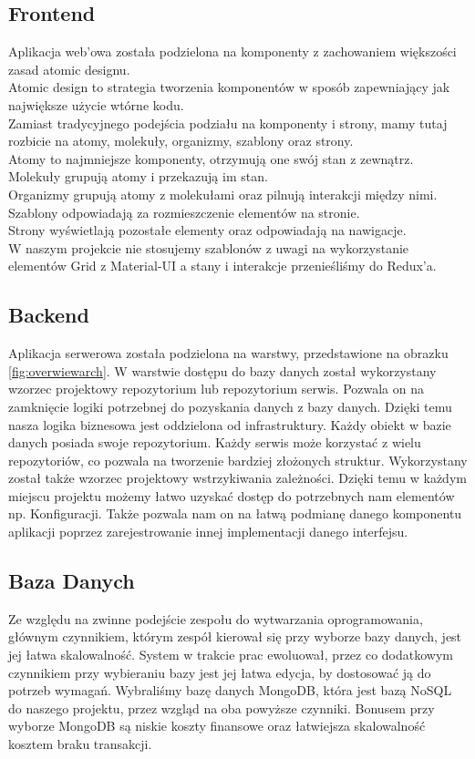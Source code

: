 \documentclass[a4paper,11pt]{report}
\begin{document}
\subsection{Frontend}
Aplikacja web'owa została podzielona na komponenty z zachowaniem większości zasad atomic designu.\\
Atomic design\cite{atomicdesign} to strategia tworzenia komponentów w sposób zapewniający jak największe użycie wtórne kodu.\\
Zamiast tradycyjnego podejścia podziału na komponenty i strony, mamy tutaj rozbicie na atomy, molekuły, organizmy, szablony oraz strony.\\
Atomy to najmniejsze komponenty, otrzymują one swój stan z zewnątrz.\\
Molekuły grupują atomy i przekazują im stan.\\
Organizmy grupują atomy z molekułami oraz pilnują interakcji między nimi.\\
Szablony odpowiadają za rozmieszczenie elementów na stronie.\\
Strony wyświetlają pozostałe elementy oraz odpowiadają na nawigacje.\\
W naszym projekcie nie stosujemy szablonów z uwagi na wykorzystanie elementów Grid z Material-UI a stany i interakcje przenieśliśmy do Redux'a.\\
\subsection{Backend}
Aplikacja serwerowa została podzielona na warstwy, przedstawione na obrazku \ref{fig:overwiewarch}.
W warstwie dostępu do bazy danych został wykorzystany wzorzec projektowy repozytorium lub repozytorium serwis.
Pozwala on na zamknięcie logiki potrzebnej do pozyskania danych z bazy danych.
Dzięki temu nasza logika biznesowa jest oddzielona od infrastruktury.
Każdy obiekt w bazie danych posiada swoje repozytorium.
Każdy serwis może korzystać z wielu repozytoriów, co pozwala na tworzenie bardziej złożonych struktur.
Wykorzystany został także wzorzec projektowy wstrzykiwania zależności.
Dzięki temu w każdym miejscu projektu możemy łatwo uzyskać dostęp do potrzebnych nam elementów np. Konfiguracji.
Także pozwala nam on na łatwą podmianę danego komponentu aplikacji poprzez zarejestrowanie innej implementacji danego interfejsu.\\
\subsection{Baza Danych}
Ze względu na zwinne podejście zespołu do wytwarzania oprogramowania, głównym czynnikiem, którym zespół kierował się przy wyborze bazy danych, jest jej łatwa skalowalność.
System w trakcie prac ewoluował, przez co dodatkowym czynnikiem przy wybieraniu bazy jest jej łatwa edycja, by dostosować ją do potrzeb wymagań. 
Wybraliśmy bazę danych MongoDB, która jest bazą NoSQL do naszego projektu, przez wzgląd na oba powyższe czynniki. Bonusem przy wyborze MongoDB są niskie koszty finansowe oraz łatwiejsza skalowalność kosztem braku transakcji.
\end{document}
